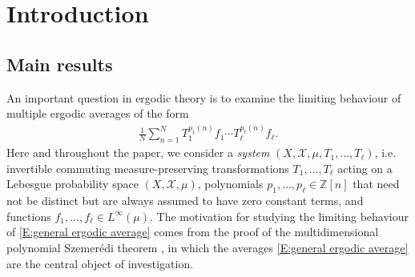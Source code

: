 \documentclass[11pt]{amsart}
\theoremstyle{definition}
\newcommand{\Z}{{\mathbb Z}}
\newcommand{\CX}{{\mathcal X}}
\begin{document}
			\tableofcontents

\section{Introduction}
\subsection{Main results} An important question in ergodic theory is to examine the limiting behaviour of multiple ergodic averages of the form
\begin{align}\label{E:general ergodic average}
    \frac{1}{N}\sum_{n=1}^N T_1^{p_1(n)}f_1 \cdots T_\ell^{p_\ell(n)}f_\ell.
\end{align}
Here and throughout the paper, we consider a \emph{system} $(X, \CX, \mu, T_1, \ldots, T_\ell)$, i.e. invertible commuting measure-preserving transformations  $T_1, \ldots, T_\ell$ acting on a Lebesgue probability space $(X, \CX, \mu)$, polynomials $p_1, \ldots, p_\ell\in\Z[n]$ that need not be distinct but are always assumed to have zero constant terms, and functions $f_1, \ldots, f_\ell\in L^\infty(\mu)$. The motivation for studying the limiting behaviour of \eqref{E:general ergodic average} comes from the proof of the multidimensional polynomial Szemer\'edi theorem \cite{BL96}, in which the averages \eqref{E:general ergodic average} are the central object of investigation.

\end{document}
